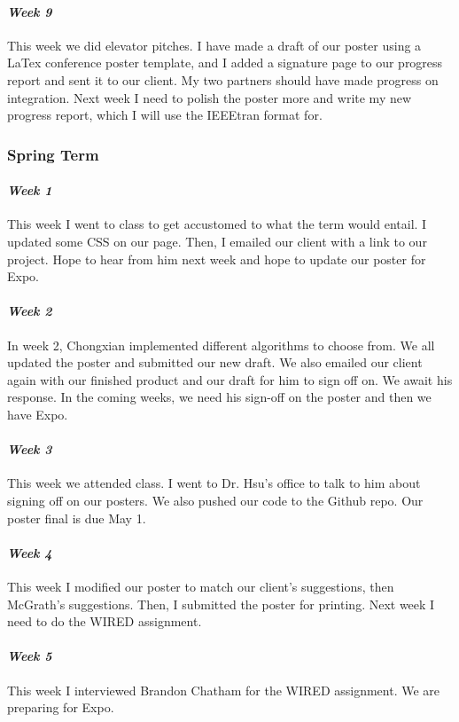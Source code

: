\documentclass[onecolumn, draftclsnofoot,10pt, compsoc]{IEEEtran}
\begin{document}
\paragraph{\emph{Week 9}}
This week we did elevator pitches. I have made a draft of our poster using a LaTex conference poster template, and I added a signature page to our progress report and sent it to our client. My two partners should have made progress on integration. Next week I need to polish the poster more and write my new progress report, which I will use the IEEEtran format for.
\subsubsection{Spring Term}
\paragraph{\emph{Week 1}}
This week I went to class to get accustomed to what the term would entail. I updated some CSS on our page. Then, I emailed our client with a link to our project. Hope to hear from him next week and hope to update our poster for Expo.
\paragraph{\emph{Week 2}}
In week 2, Chongxian implemented different algorithms to choose from. We all updated the poster and submitted our new draft. We also emailed our client again with our finished product and our draft for him to sign off on. We await his response. In the coming weeks, we need his sign-off on the poster and then we have Expo.
\paragraph{\emph{Week 3}}
This week we attended class. I went to Dr. Hsu's office to talk to him about signing off on our posters. We also pushed our code to the Github repo. Our poster final is due May 1.
\paragraph{\emph{Week 4}}
This week I modified our poster to match our client's suggestions, then McGrath's suggestions. Then, I submitted the poster for printing. Next week I need to do the WIRED assignment.
\paragraph{\emph{Week 5}}
This week I interviewed Brandon Chatham for the WIRED assignment. We are preparing for Expo.
\end{document}
